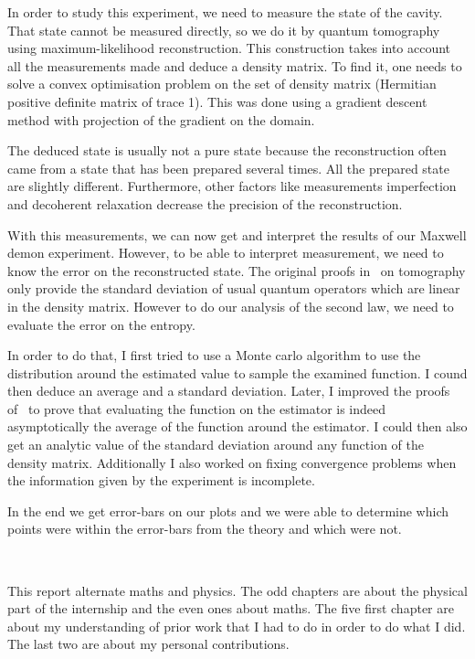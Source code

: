 \documentclass[10pt,a4paper]{report}
\theoremstyle{plain}
\theoremstyle{definition}
\theoremstyle{remark}
\begin{document}
In order to study this experiment, we need to measure the state of the cavity.
That state cannot be measured directly, so we do it by quantum tomography using
maximum-likelihood reconstruction. This construction takes into account all the
measurements made and deduce a density matrix. To find it, one needs to solve a
convex optimisation problem on the set of density matrix (Hermitian positive
definite matrix of trace 1). This was done using a gradient descent method with
projection of the gradient on the domain.

The deduced state is usually not a pure state because the reconstruction often
came from a state that has been prepared several times.
All the prepared state are slightly different.
Furthermore, other factors like measurements imperfection and decoherent
relaxation decrease the precision of the reconstruction.

With this measurements, we can now get and interpret the results of our Maxwell
demon experiment. However, to be able to interpret measurement, we need to know
the error on the reconstructed state. The original proofs in~\cite{SPRAL17} on
tomography only provide the standard deviation of usual quantum operators which
are linear in the density matrix. However to do our analysis of the second law,
we need to evaluate the error on the entropy.

In order to do that, I first tried to use a Monte carlo algorithm to use the
distribution around the estimated value to sample the examined function. I cound
then deduce an average and a standard deviation. Later, I improved the proofs
of~\cite{SPRAL17} to prove that evaluating the function on the estimator is
indeed asymptotically the average of the function around the estimator. I could
then also get an analytic value of the standard deviation around any
function of the density matrix. Additionally I also worked on fixing convergence
problems when the information given by the experiment is incomplete.

In the end we get error-bars on our plots and we were able to determine which
points were within the error-bars from the theory and which were not.

\

This report alternate maths and physics. The odd chapters are about the physical
part of the internship and the even ones about maths. The five first chapter are
about my understanding of prior work that I had to do in order to do what I did.
The last two are about my personal contributions.
\end{document}
